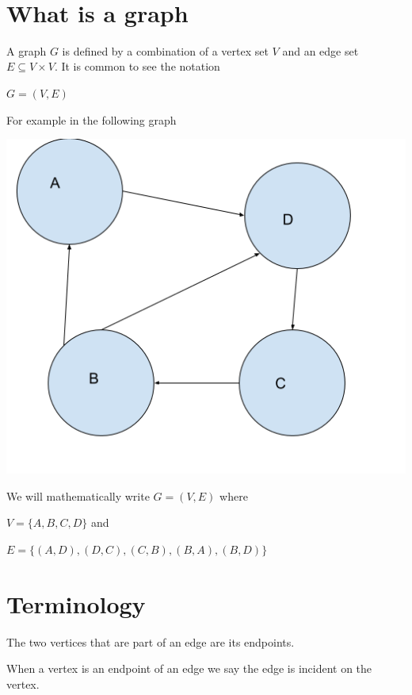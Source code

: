 \documentclass[12pt]{article}
\begin{document}
\begin{center}
\\
\vspace{1cm}
\end{center}

\vspace{0.5cm}\noindent


\section*{What is a graph}

A graph $G$ is defined by a combination of a vertex set $V$ and an edge set $E \subseteq V \times V$.
It is common to see the notation

$G = (V,E)$

For example in the following graph

\includegraphics[scale=0.5]{graph1.png}

We will mathematically write $G = (V, E)$ where 

$V = \{A,B,C,D\}$ and 

$E = \{(A,D), (D,C), (C,B), (B,A), (B,D)\}$

\section*{Terminology}

The two vertices that are part of an edge are its endpoints.

When a vertex is an endpoint of an edge we say the edge is incident on the vertex.
\end{document}
